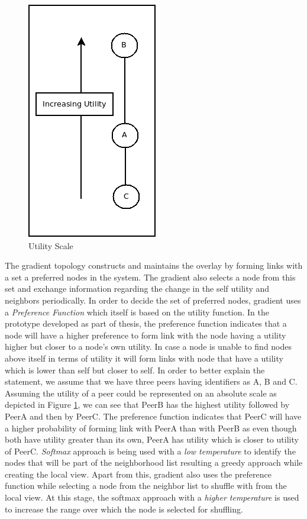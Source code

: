 \documentclass[a4paper,11pt]{kth-mag}
\begin{document}
\begin{figure}[h]
	\centering
	\includegraphics[scale=0.5]{preference}
	\caption{Utility Scale}
	\label{fig:preference}
\end{figure}

\par The gradient topology constructs and maintains the overlay by forming links with a set a preferred nodes in the system. The gradient also selects a node from this set and exchange information regarding the change in the self utility and neighbors periodically. In order to decide the set of preferred nodes, gradient uses a \textit{Preference Function} which itself is based on the utility function. In the prototype developed as part of thesis, the preference function indicates that a node will have a higher preference to form link with the node having a utility higher but closer to a node's own utility. In case a node is unable to find nodes above itself in terms of utility it will form links with node that have a utility which is lower than self but closer to self. In order to better explain the statement, we assume that we have three peers having identifiers as A, B and C. Assuming the utility of a peer could be represented on an absolute scale as depicted in Figure \ref{fig:preference}, we can see that PeerB has the highest utility  followed by PeerA and then by PeerC. The preference function indicates that PeerC will have a higher probability of forming link with PeerA than with PeerB as even though both have utility greater than its own, PeerA has utility which is closer to utility of PeerC. \textit{Softmax} approach is being used with a \textit{low temperature} to identify the nodes that will be part of the neighborhood list resulting a greedy approach while creating the local view. Apart from this, gradient also uses the  preference function while selecting a node from the neighbor list to shuffle with from the local view. At this stage, the softmax approach with a \textit{higher temperature} is used to increase the range over which the node is selected for shuffling.
\end{document}

